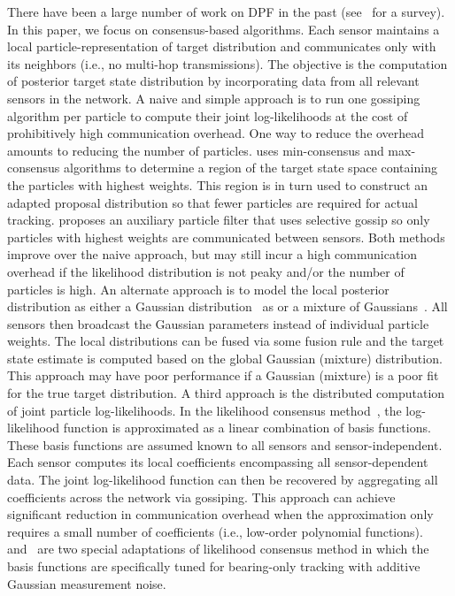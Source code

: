 \documentclass[10pt,letterpaper,final]{article}
\begin{document}
There have been a large number of work on DPF in the past (see~\cite{Hlinka2012Survey} for a survey). In this paper, we focus on consensus-based algorithms. Each sensor maintains a local particle-representation of target distribution and communicates only with its neighbors (i.e., no multi-hop transmissions). The objective is the computation of posterior target state distribution by incorporating data from all relevant sensors in the network. A naive and simple approach is to run one gossiping algorithm per particle to compute their joint log-likelihoods at the cost of prohibitively high communication overhead. One way to reduce the overhead amounts to reducing the number of particles. \cite{Farahmand2011} uses min-consensus and max-consensus algorithms to determine a region of the target state space containing the particles with highest weights. This region is in turn used to construct an adapted proposal distribution so that fewer particles are required for actual tracking. \cite{Ustebay2011} proposes an auxiliary particle filter that uses selective gossip so only particles with highest weights are communicated between sensors. Both methods improve over the naive approach, but may still incur a high communication overhead if the likelihood distribution is not peaky and/or the number of particles is high. An alternate approach is to model the local posterior distribution as either a Gaussian distribution~\cite{Gu2008} as or a mixture of Gaussians~\cite{Sheng2005}. All sensors then broadcast the Gaussian parameters instead of individual particle weights. The local distributions can be fused via some fusion rule and the target state estimate is computed based on the global Gaussian (mixture) distribution. This approach may have poor performance if a Gaussian (mixture) is a poor fit for the true target distribution. A third approach is the distributed computation of joint particle log-likelihoods. In the likelihood consensus method~\cite{Hlinka2012}, the log-likelihood function is approximated as a linear combination of basis functions. These basis functions are assumed known to all sensors and sensor-independent. Each sensor computes its local coefficients encompassing all sensor-dependent data. The joint log-likelihood function can then be recovered by aggregating all coefficients across the network via gossiping. This approach can achieve significant reduction in communication overhead when the approximation only requires a small number of coefficients (i.e., low-order polynomial functions). \cite{Mohammadi2012} and~\cite{Yu2016} are two special adaptations of likelihood consensus method in which the basis functions are specifically tuned for bearing-only tracking with additive Gaussian measurement noise.
\end{document}
